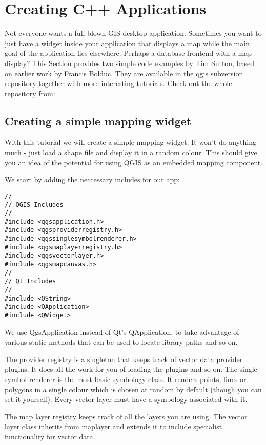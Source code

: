\section{Creating C++ Applications}

Not everyone wants a full blown GIS desktop application. Sometimes you want
to just have a widget inside your application that displays a map while the
main goal of the application lies elsewhere. Perhaps a database frontend with
a map display? This Section provides two simple code examples by Tim Sutton, 
based on earlier work by Francis Bolduc. They are available in the qgis 
subversion repository together with more interesting tutorials. Check out 
the whole repository from: 

\subsection{Creating a simple mapping widget}\label{subsec:simple_widget}

With this tutorial we will create a simple mapping widget. It won't do 
anything much - just load a shape file and display it in a random colour. 
This should give you an idea of the potential for using QGIS as an embedded
mapping component.

We start by adding the neccessary includes for our app:

\begin{verbatim}
//
// QGIS Includes
//
#include <qgsapplication.h>
#include <qgsproviderregistry.h>
#include <qgssinglesymbolrenderer.h>
#include <qgsmaplayerregistry.h>
#include <qgsvectorlayer.h>
#include <qgsmapcanvas.h>
//
// Qt Includes
//
#include <QString>
#include <QApplication>
#include <QWidget>
\end{verbatim}

We use QgsApplication instead of Qt's QApplication, to take advantage of 
various static methods that can be used to locate library paths and so on.

The provider registry is a singleton that keeps track of vector data provider
plugins. It does all the work for you of loading the plugins and so on. The
single symbol renderer is the most basic symbology class. It renders points,
lines or polygons in a single colour which is chosen at random by default
(though you can set it yourself). Every vector layer must have a symbology
associated with it.

The map layer registry keeps track of all the layers you are using. The
vector layer class inherits from maplayer and extends it to include
specialist functionality for vector data.

